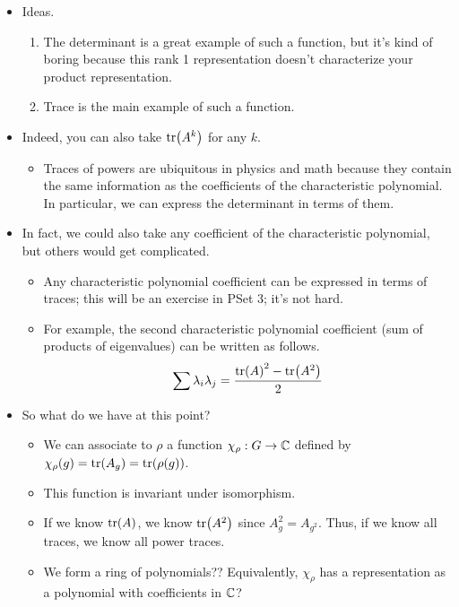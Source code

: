 \documentclass[../notes.tex]{subfiles}
\begin{document}
\begin{itemize}
    \item Ideas.
    \begin{enumerate}
        \item The determinant is a great example of such a function, but it's kind of boring because this rank 1 representation doesn't characterize your product representation.
        \item Trace is the main example of such a function.
    \end{enumerate}
    \item Indeed, you can also take $\tr(A^k)$ for any $k$.
    \begin{itemize}
        \item Traces of powers are ubiquitous in physics and math because they contain the same information as the coefficients of the characteristic polynomial. In particular, we can express the determinant in terms of them.
    \end{itemize}
    \item In fact, we could also take any coefficient of the characteristic polynomial, but others would get complicated.
    \begin{itemize}
        \item Any characteristic polynomial coefficient can be expressed in terms of traces; this will be an exercise in PSet 3; it's not hard.
        \item For example, the second characteristic polynomial coefficient (sum of products of eigenvalues) can be written as follows.
        \begin{equation*}
            \sum\lambda_i\lambda_j = \frac{\tr(A)^2-\tr(A^2)}{2}
        \end{equation*}
    \end{itemize}
    \item So what do we have at this point?
    \begin{itemize}
        \item We can associate to $\rho$ a function $\chi_\rho:G\to\mathbb{C}$ defined by $\chi_\rho(g)=\tr(A_g)=\tr(\rho(g))$.
        \item This function is invariant under isomorphism.
        \item If we know $\tr(A)$, we know $\tr(A^2)$ since $A_g^2=A_{g^2}$. Thus, if we know all traces, we know all power traces.
        \item We form a ring of polynomials?? Equivalently, $\chi_\rho$ has a representation as a polynomial with coefficients in $\mathbb{C}$?
    \end{itemize}

\end{itemize}
\end{document}

